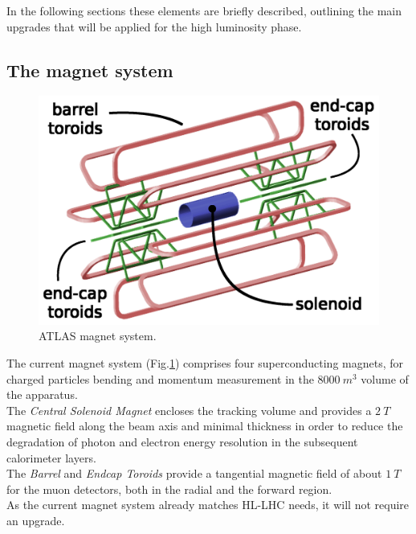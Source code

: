 \documentclass[a4paper,twoside,12pt]{article}
\begin{document}
In the following sections these elements are briefly described, outlining the main upgrades that will be applied for the high luminosity phase. 

\subsection{The magnet system}\label{sec:magnet}

\begin{figure} [h]
	\centering
	\includegraphics[scale=0.13]{magnetSystems}
	\caption{ATLAS magnet system\cite{magnet_system_picture}.}
	\label{fig:magnet_system_picture}
\end{figure}

The current magnet system (Fig.\ref{fig:magnet_system_picture}) comprises four superconducting magnets\cite{magnet_system}, for charged particles bending and momentum measurement in the $8000\ m^3$ volume of the apparatus.\\

The \textit{Central Solenoid Magnet} encloses the tracking volume and provides a $2\ T$ magnetic field along the beam axis and minimal thickness in order to reduce the degradation of photon and electron energy resolution in the subsequent calorimeter layers.\\

The \textit{Barrel} and \textit{Endcap Toroids} provide a tangential magnetic field of about $1\ T$ for the muon detectors, both in the radial and the forward region.\\

As the current magnet system already matches HL-LHC needs, it will not require an
upgrade.
\end{document}

